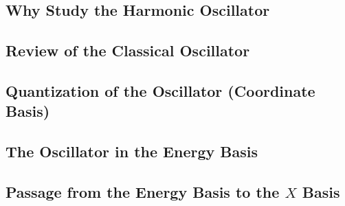 \subsection{Why Study the Harmonic Oscillator}

\subsection{Review of the Classical Oscillator}

\subsection{Quantization of the Oscillator (Coordinate Basis)}

\subsection{The Oscillator in the Energy Basis}

\subsection[Passage from the Energy Basis to the Coordinate Basis]{Passage from the Energy Basis to the $X$ Basis}
